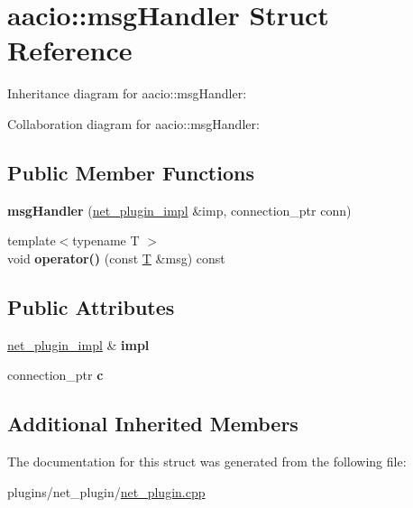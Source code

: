 \hypertarget{structaacio_1_1msg_handler}{}\section{aacio\+:\+:msg\+Handler Struct Reference}
\label{structaacio_1_1msg_handler}


Inheritance diagram for aacio\+:\+:msg\+Handler\+:


Collaboration diagram for aacio\+:\+:msg\+Handler\+:
\subsection*{Public Member Functions}
\begin{DoxyCompactItemize}
\item 
\mbox{\label{structaacio_1_1msg_handler_ad6d51566b038216ee90cf8f986b92d20}} 
{\bfseries msg\+Handler} (\mbox{\hyperlink{classaacio_1_1net__plugin__impl}{net\+\_\+plugin\+\_\+impl}} \&imp, connection\+\_\+ptr conn)
\item 
\mbox{\label{structaacio_1_1msg_handler_a7e556344ebace77b7bb42f4ee7c52a7f}} 
{\footnotesize template$<$typename T $>$ }\\void {\bfseries operator()} (const \mbox{\hyperlink{struct_t}{T}} \&msg) const
\end{DoxyCompactItemize}
\subsection*{Public Attributes}
\begin{DoxyCompactItemize}
\item 
\mbox{\label{structaacio_1_1msg_handler_a25ee8e39e0875e88271c93c7545e23b2}} 
\mbox{\hyperlink{classaacio_1_1net__plugin__impl}{net\+\_\+plugin\+\_\+impl}} \& {\bfseries impl}
\item 
\mbox{\label{structaacio_1_1msg_handler_a351657a559561324cc2e7d62584d25a8}} 
connection\+\_\+ptr {\bfseries c}
\end{DoxyCompactItemize}
\subsection*{Additional Inherited Members}


The documentation for this struct was generated from the following file\+:\begin{DoxyCompactItemize}
\item 
plugins/net\+\_\+plugin/\mbox{\hyperlink{net__plugin_8cpp}{net\+\_\+plugin.\+cpp}}\end{DoxyCompactItemize}
